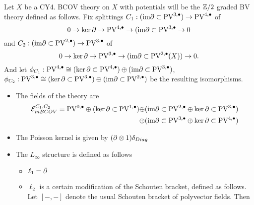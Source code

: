 \documentclass[11pt]{article}
\begin{document}
\iffalse
Let \(X\) be a CY4. BCOV theory on \(X\) with potentials will be the \(\mathbb{Z}/2\) graded BV theory defined as follows. Fix splittings \(C_1: (\text{im}\partial\subset\text{PV}^{3,\bullet})\to \text{PV}^{4,\bullet}\) of  \[0\to\ker\partial\to \text{PV}^{4,\bullet}\to(\text{im}\partial\subset\text{PV}^{3,\bullet}\to 0\] and \(C_2: (\text{im}\partial\subset\text{PV}^{2,\bullet})\to\text{PV}^{3,\bullet}\) of \[0\to\ker\partial\to\text{PV}^{3,\bullet}\to(\text{im}\partial\subset\text{PV}^{2,\bullet}(X))\to 0.\] And let \(\phi_{C_1} : \text{PV}^{4,\bullet}\cong(\ker\partial\subset\text{PV}^{4,\bullet})\oplus(\text{im}\partial\subset\text{PV}^{3,\bullet})\), \(\phi_{C_2}: \text{PV}^{3,\bullet}\cong(\ker\partial\subset\text{PV}^{3,\bullet})\oplus(\text{im}\partial\subset\text{PV}^{2,\bullet})\) be the resulting isomorphisms.
\begin{itemize}
\item The fields of the theory are
 \[\begin{aligned} \mathcal{E}_{mBCOV}^{C_1,C_2} = \text{PV}^{0,\bullet} \oplus (\ker\partial\subset\text{PV}^{1,\bullet})\oplus & (\text{im}\partial\subset\text{PV}^{2,\bullet} \oplus\ker\partial\subset\text{PV}^{3,\bullet})\\ \oplus &(\text{im}\partial\subset\text{PV}^{3,\bullet}\oplus\ker\partial\subset\text{PV}^{4,\bullet})\end{aligned}\]
\item The Poisson kernel is given by $(\partial\otimes 1)\delta_{Diag}$
\item The \(L_\infty\) structure is defined as follows
\begin{itemize}
\item \(\ell_1=\bar{\partial}\)
\item \(\ell_2\) is a certain modification of the Schouten bracket, defined as follows. Let \([-,-]\) denote the usual Schouten bracket of polyvector fields. Then


\end{itemize}
\end{itemize}
\end{document}
